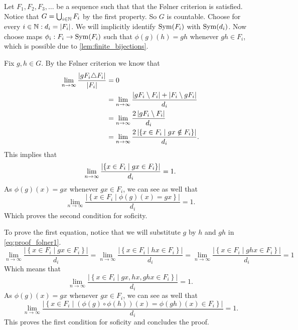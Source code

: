 Let $F_1, F_2, F_3, \dots $ be a sequence such that that the Følner criterion is satisfied. Notice that $G = \bigcup_{i \in \mathbb{N}} F_i$ by the first property. So $G$ is countable. 
Choose for every $i \in \mathbb{N}: d_i = |F_i|$. We will implicitly identify $\operatorname{Sym}(F_i)$ with $\operatorname{Sym}(d_i)$. Now choose maps $\phi_i: F_i \to \operatorname{Sym}(F_i)$ such that $\phi(g)(h) = gh$ whenever $gh \in F_i$, which is possible due to \cref{lem:finite_bijections}. 

Fix $g, h \in G$. By the Følner criterion we know that 
\begin{align*}
    \lim_{n\to \infty} \frac{\left| gF_i \triangle F_i \right|}{\left| F_i \right|} &= 0\\
    &= \lim_{n\to \infty} \frac{\left| gF_i \setminus F_i \right| + \left| F_i \setminus gF_i \right|}{d_i}\\
    &= \lim_{n\to \infty} \frac{2\left|  gF_i \setminus F_i  \right|}{d_i}\\
    &= \lim_{n\to \infty} \frac{2\left| \left\{ x \in F_i \mid gx \notin F_i \right\} \right|}{d_i}. 
\end{align*}
This implies that \begin{equation}\label{eq:proof_folner1}
    \lim_{n\to \infty} \frac{\left| \left\{ x \in F_i \mid gx \in F_i \right\} \right|}{d_i} = 1.
\end{equation}
As $\phi(g)(x) = gx$ whenever $gx \in F_i$, we can see as well that $$\lim_{n\to \infty} \frac{\left|\left\{ x \in F_i \mid \phi(g)(x) = gx \right\}\right|}{d_i} = 1.$$
Which proves the second condition for soficity. 

To prove the first equation, notice that we will substitute $g$ by $h$ and $gh$ in \cref{eq:proof_folner1}.
$$ \lim_{n\to \infty} \frac{\left|\left\{ x \in F_i \mid gx \in F_i \right\}\right|}{d_i} =
\lim_{n\to \infty} \frac{\left|\left\{ x \in F_i \mid hx \in F_i \right\}\right|}{d_i} =
\lim_{n\to \infty} \frac{\left|\left\{ x \in F_i \mid ghx \in F_i \right\}\right|}{d_i}= 1$$
Which means that 
$$\lim_{n\to \infty} \frac{\left|\left\{ x \in F_i \mid gx,hx,ghx \in F_i \right\}\right|}{d_i}= 1.$$
As $\phi(g)(x) = gx$ whenever $gx \in F_i$, we can see as well that
$$\lim_{n\to \infty} \frac{\left|\left\{ x \in F_i \mid (\phi(g) \circ\phi(h))(x) = \phi(gh)(x) \in F_i \right\}\right|}{d_i}= 1.$$
This proves the first condition for soficity and concludes the proof. 
